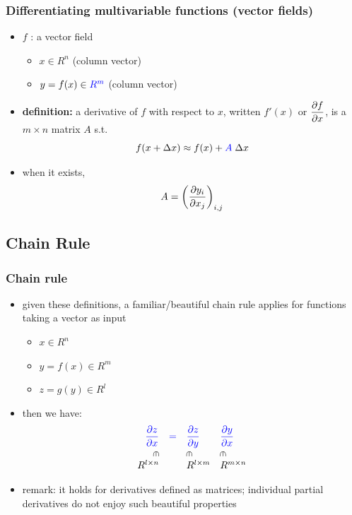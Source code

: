 \documentclass[12pt,dvipdfmx]{beamer}
\newcommand{\ao}[1]{{\color{blue}#1}}
\begin{document}
\begin{frame}
\frametitle{Differentiating multivariable functions (vector fields)}
\begin{itemize}
\item $f$ : a vector field
  \begin{itemize}
  \item $x \in R^n$ (column vector)
  \item $y = f(x) \in \ao{R^m}$ (column vector)
  \end{itemize}

\item \ao{\textbf{definition:}} a derivative of $f$ with respect to $x$, 
  written $f'(x)$ or ${\displaystyle \frac{\partial f}{\partial x}}$, is 
  \ao{a $m \times n$ matrix $A$} s.t.
\[ f(x + \Delta x) \approx f(x) + \ao{A} \; \Delta x \]

\item when it exists, 
\[ A = \left(\frac{\partial y_i}{\partial x_j}\right)_{i,j} \]

\end{itemize}
\end{frame}

\newcommand{\rin}{\rotatebox[origin=c]{-90}{$\in$}}

\subsection{Chain Rule}

\begin{frame}
\frametitle{Chain rule}
\begin{itemize}
\item given these definitions, a familiar/beautiful 
chain rule applies for functions taking a vector as input
\begin{itemize}
\item $x \in R^n$
\item $y = f(x) \in R^m$
\item $z = g(y) \in R^l$
\end{itemize}
\item then we have:
\[
\begin{array}{rcll}
{\displaystyle\ao{\pp{z}{x}}}     & \ao{=} & {\displaystyle\ao{\pp{z}{y}}}     & {\displaystyle\ao{\pp{y}{x}}}   \\
 \rin            &        & \rin               & \rin          \\
R^{l\times n}      &        & R^{l\times m}       & R^{m\times n} \\
\end{array}
\]

\item remark: it holds for derivatives defined as matrices;
  individual partial derivatives do not enjoy such beautiful properties
\end{itemize}
\end{frame}
\end{document}
